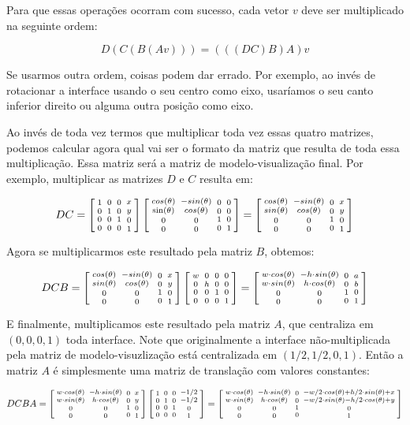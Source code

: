 Para que essas operações ocorram com sucesso, cada vetor $v$
deve ser multiplicado na seguinte ordem:

$$
D(C(B(A v))) = (((DC)B)A)v
$$

Se usarmos outra ordem, coisas podem dar errado. Por exemplo, ao invés
de rotacionar a interface usando o seu centro como eixo, usaríamos o
seu canto inferior direito ou alguma outra posição como eixo.

Ao invés de toda vez termos que multiplicar toda vez essas quatro
matrizes, podemos calcular agora qual vai ser o formato da matriz que
resulta de toda essa multiplicação. Essa matriz será a matriz de
modelo-visualização final. Por exemplo, multiplicar as matrizes $D$ e
$C$ resulta em:

$$ DC=\left[{{1 \atop 0}\atop {0\atop 0}}{{0 \atop 1}\atop {0 \atop
      0}}{{0\atop 0}\atop{1 \atop 0}}{{x \atop y}\atop{0\atop
      1}}\right]\left[{{cos(\theta) \atop \sin(\theta)}\atop {0\atop
      0}}{{-sin(\theta) \atop cos(\theta)}\atop {0 \atop 0}}{{0\atop
      0}\atop{1 \atop 0}}{{0 \atop 0}\atop{0\atop 1}}\right]=
\left[{{cos(\theta) \atop sin(\theta)}\atop {0\atop 0}}
  {{-sin(\theta) \atop cos(\theta)}\atop {0 \atop 0}}
  {{0\atop 0}\atop{1 \atop 0}}
  {{x \atop y}\atop{0\atop 1}}\right]
$$

Agora se multiplicarmos este resultado pela matriz $B$, obtemos:

$$ DCB = \left[{{cos(\theta) \atop sin(\theta)}\atop {0\atop 0}}
  {{-sin(\theta) \atop cos(\theta)}\atop {0 \atop 0}} {{0\atop
      0}\atop{1 \atop 0}} {{x \atop y}\atop{0\atop 1}}\right]\left[{{w
      \atop 0}\atop {0\atop 0}}{{0 \atop h}\atop {0 \atop 0}}{{0\atop
      0}\atop{1 \atop 0}}{{0 \atop 0}\atop{0\atop 1}}\right]=
\left[{{w\cdot cos(\theta) \atop w\cdot sin(\theta)}\atop {0\atop 0}}
  {{-h\cdot sin(\theta) \atop h\cdot cos(\theta)}\atop {0 \atop 0}}
  {{0\atop 0}\atop{1 \atop 0}}
  {{a \atop b}\atop{0\atop 1}}\right]
$$

E finalmente, multiplicamos este resultado pela matriz $A$, que
centraliza em $(0, 0, 0, 1)$ toda interface. Note que originalmente a
interface não-multiplicada pela matriz de modelo-visuzlização está
centralizada em $(1/2, 1/2, 0, 1)$. Então a matriz $A$ é simplesmente
uma matriz de translação com valores constantes:

$$
DCBA=\left[{{w\cdot cos(\theta) \atop w\cdot sin(\theta)}\atop {0\atop 0}}
  {{-h\cdot sin(\theta) \atop h\cdot cos(\theta)}\atop {0 \atop 0}}
  {{0\atop 0}\atop{1 \atop 0}}
  {{x \atop y}\atop{0\atop 1}}\right]
\left[{{1 \atop 0}\atop {0\atop 0}}{{0 \atop 1}\atop {0 \atop
      0}}{{0\atop 0}\atop{1 \atop 0}}{{-1/2 \atop -1/2}\atop{0\atop
      1}}\right]=
\left[{{w\cdot cos(\theta) \atop w\cdot sin(\theta)}\atop {0\atop 0}}
  {{-h\cdot sin(\theta) \atop h\cdot cos(\theta)}\atop {0 \atop 0}}
  {{0\atop 0}\atop{1 \atop 0}}
  {{-w/2\cdot cos(\theta) + h/2\cdot sin(\theta)+x \atop -w/2\cdot sin(\theta)-h/2\cdot cos(\theta)+y}\atop{0\atop 1}}\right]
$$


